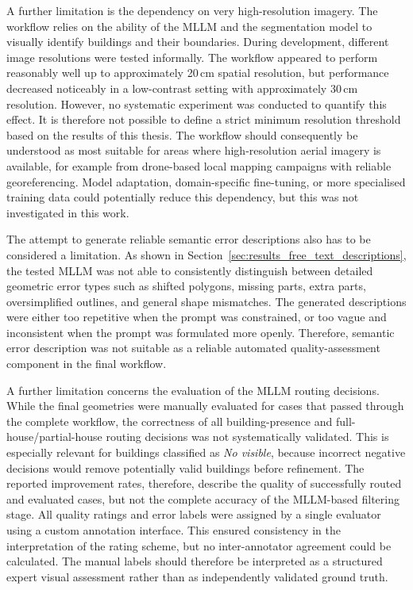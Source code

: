 A further limitation is the dependency on very high-resolution imagery. The workflow relies on the ability of the MLLM and the segmentation model to visually identify buildings and their boundaries. During development, different image resolutions were tested informally. The workflow appeared to perform reasonably well up to approximately 20\,cm spatial resolution, but performance decreased noticeably in a low-contrast setting with approximately 30\,cm resolution. However, no systematic experiment was conducted to quantify this effect. It is therefore not possible to define a strict minimum resolution threshold based on the results of this thesis. The workflow should consequently be understood as most suitable for areas where high-resolution aerial imagery is available, for example from drone-based local mapping campaigns with reliable georeferencing. Model adaptation, domain-specific fine-tuning, or more specialised training data could potentially reduce this dependency, but this was not investigated in this work.

The attempt to generate reliable semantic error descriptions also has to be considered a limitation. As shown in Section~\ref{sec:results_free_text_descriptions}, the tested MLLM was not able to consistently distinguish between detailed geometric error types such as shifted polygons, missing parts, extra parts, oversimplified outlines, and general shape mismatches. The generated descriptions were either too repetitive when the prompt was constrained, or too vague and inconsistent when the prompt was formulated more openly. Therefore, semantic error description was not suitable as a reliable automated quality-assessment component in the final workflow.

A further limitation concerns the evaluation of the MLLM routing decisions. While the final geometries were manually evaluated for cases that passed through the complete workflow, the correctness of all building-presence and full-house/partial-house routing decisions was not systematically validated. This is especially relevant for buildings classified as \textit{No visible}, because incorrect negative decisions would remove potentially valid buildings before refinement. The reported improvement rates, therefore, describe the quality of successfully routed and evaluated cases, but not the complete accuracy of the MLLM-based filtering stage. All quality ratings and error labels were assigned by a single evaluator using a custom annotation interface. This ensured consistency in the interpretation of the rating scheme, but no inter-annotator agreement could be calculated. The manual labels should therefore be interpreted as a structured expert visual assessment rather than as independently validated ground truth.

